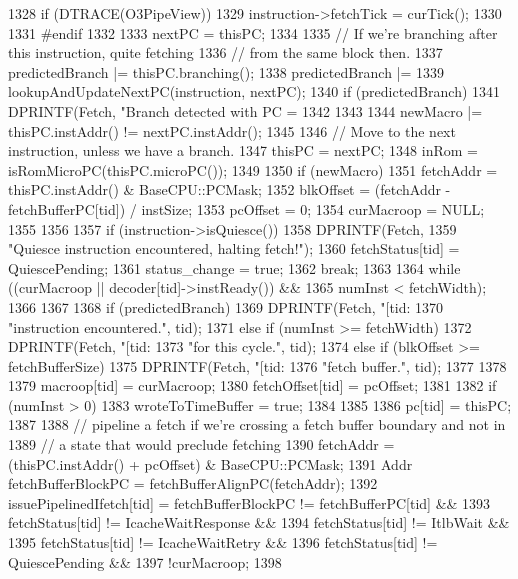\begin{DoxyCode}
{{{1328             if (DTRACE(O3PipeView)) {
1329                 instruction->fetchTick = curTick();
1330             }
1331 #endif
1332 
1333             nextPC = thisPC;
1334 
1335             // If we're branching after this instruction, quite fetching
1336             // from the same block then.
1337             predictedBranch |= thisPC.branching();
1338             predictedBranch |=
1339                 lookupAndUpdateNextPC(instruction, nextPC);
1340             if (predictedBranch) {
1341                 DPRINTF(Fetch, "Branch detected with PC = %
1342             }
1343 
1344             newMacro |= thisPC.instAddr() != nextPC.instAddr();
1345 
1346             // Move to the next instruction, unless we have a branch.
1347             thisPC = nextPC;
1348             inRom = isRomMicroPC(thisPC.microPC());
1349 
1350             if (newMacro) {
1351                 fetchAddr = thisPC.instAddr() & BaseCPU::PCMask;
1352                 blkOffset = (fetchAddr - fetchBufferPC[tid]) / instSize;
1353                 pcOffset = 0;
1354                 curMacroop = NULL;
1355             }
1356 
1357             if (instruction->isQuiesce()) {
1358                 DPRINTF(Fetch,
1359                         "Quiesce instruction encountered, halting fetch!");
1360                 fetchStatus[tid] = QuiescePending;
1361                 status_change = true;
1362                 break;
1363             }
1364         } while ((curMacroop || decoder[tid]->instReady()) &&
1365                  numInst < fetchWidth);
1366     }
1367 
1368     if (predictedBranch) {
1369         DPRINTF(Fetch, "[tid:%
1370                 "instruction encountered.\n", tid);
1371     } else if (numInst >= fetchWidth) {
1372         DPRINTF(Fetch, "[tid:%
1373                 "for this cycle.\n", tid);
1374     } else if (blkOffset >= fetchBufferSize) {
1375         DPRINTF(Fetch, "[tid:%
1376                 "fetch buffer.\n", tid);
1377     }
1378 
1379     macroop[tid] = curMacroop;
1380     fetchOffset[tid] = pcOffset;
1381 
1382     if (numInst > 0) {
1383         wroteToTimeBuffer = true;
1384     }
1385 
1386     pc[tid] = thisPC;
1387 
1388     // pipeline a fetch if we're crossing a fetch buffer boundary and not in
1389     // a state that would preclude fetching
1390     fetchAddr = (thisPC.instAddr() + pcOffset) & BaseCPU::PCMask;
1391     Addr fetchBufferBlockPC = fetchBufferAlignPC(fetchAddr);
1392     issuePipelinedIfetch[tid] = fetchBufferBlockPC != fetchBufferPC[tid] &&
1393         fetchStatus[tid] != IcacheWaitResponse &&
1394         fetchStatus[tid] != ItlbWait &&
1395         fetchStatus[tid] != IcacheWaitRetry &&
1396         fetchStatus[tid] != QuiescePending &&
1397         !curMacroop;
1398 }
\end{DoxyCode}
